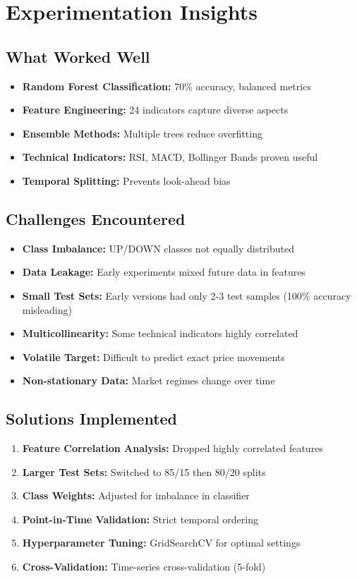 \section{Experimentation Insights}

\subsection{What Worked Well}

\begin{itemize}
    \item \textbf{Random Forest Classification:} 70\% accuracy, balanced metrics
    \item \textbf{Feature Engineering:} 24 indicators capture diverse aspects
    \item \textbf{Ensemble Methods:} Multiple trees reduce overfitting
    \item \textbf{Technical Indicators:} RSI, MACD, Bollinger Bands proven useful
    \item \textbf{Temporal Splitting:} Prevents look-ahead bias
\end{itemize}

\subsection{Challenges Encountered}

\begin{itemize}
    \item \textbf{Class Imbalance:} UP/DOWN classes not equally distributed
    \item \textbf{Data Leakage:} Early experiments mixed future data in features
    \item \textbf{Small Test Sets:} Early versions had only 2-3 test samples (100\% accuracy misleading)
    \item \textbf{Multicollinearity:} Some technical indicators highly correlated
    \item \textbf{Volatile Target:} Difficult to predict exact price movements
    \item \textbf{Non-stationary Data:} Market regimes change over time
\end{itemize}

\subsection{Solutions Implemented}

\begin{enumerate}
    \item \textbf{Feature Correlation Analysis:} Dropped highly correlated features
    \item \textbf{Larger Test Sets:} Switched to 85/15 then 80/20 splits
    \item \textbf{Class Weights:} Adjusted for imbalance in classifier
    \item \textbf{Point-in-Time Validation:} Strict temporal ordering
    \item \textbf{Hyperparameter Tuning:} GridSearchCV for optimal settings
    \item \textbf{Cross-Validation:} Time-series cross-validation (5-fold)
\end{enumerate}

